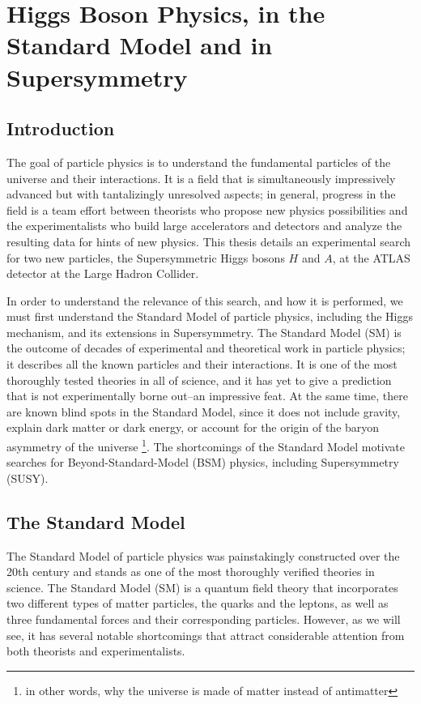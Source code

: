  

\chapter[Theory of Higgs Physics]{Higgs Boson Physics, in the Standard Model and in Supersymmetry}
\label{chapter:Theory}



\section{Introduction}
The goal of particle physics is to understand the fundamental particles of the universe and 
their interactions. It is a field that is simultaneously impressively advanced but 
with tantalizingly unresolved aspects; in general, progress in the field is a team 
effort between theorists who propose new physics possibilities and the experimentalists who build 
large accelerators and detectors and analyze the resulting data for hints of new physics. This thesis details 
an experimental search for two new particles, the Supersymmetric Higgs bosons $H$ 
and $A$, at the ATLAS detector at the Large Hadron Collider.

In order to understand the relevance of this search, and how it is performed, 
we must first understand the Standard Model of particle physics, including the Higgs mechanism, 
and its extensions in Supersymmetry.  The Standard Model (SM) is the outcome of decades of 
experimental and theoretical work in particle physics; it describes all the known particles and 
their interactions.  It is one of the most thoroughly tested theories in all of 
science, and it has yet to give a prediction that is not experimentally borne 
out--an impressive feat.  At the same time, there are known blind 
spots in the Standard Model, since it does not include gravity, explain dark 
matter or dark energy, or account for the origin of the baryon asymmetry of the universe
\footnote{in other words, why the universe is made of matter instead of antimatter}.   The shortcomings of the 
Standard Model motivate searches for Beyond-Standard-Model (BSM) physics, including Supersymmetry (SUSY).  


\section{The Standard Model}
The Standard Model of particle physics was painstakingly constructed over the 20th century and stands 
as one of the most thoroughly verified theories in science.  The Standard Model 
(SM) is a quantum field theory that incorporates two different types of matter 
particles, the quarks and the leptons, as well as three fundamental forces and 
their corresponding particles.  However, as we will see, it has several notable 
shortcomings that attract considerable attention from both theorists and experimentalists.  

